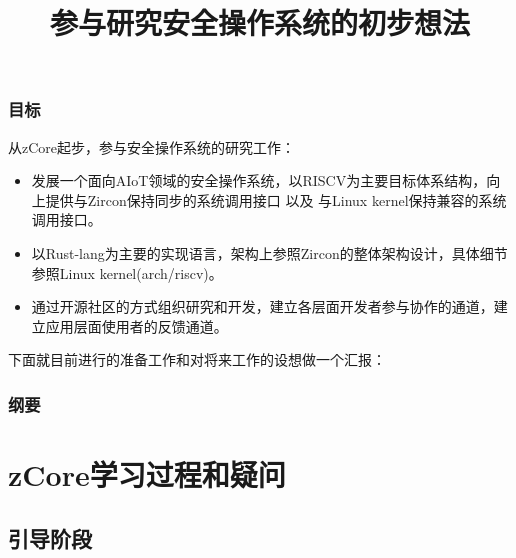 \documentclass[
8pt, %
]{beamer}
\title{参与研究安全操作系统的初步想法}
\institute[Massclouds]{\large 乾云科技}
\begin{document}
	\begin{frame}
		\titlepage
	\end{frame}

	\begin{frame}
		\frametitle{目标}
		{\large 从zCore起步，参与安全操作系统的研究工作：}
		\begin{itemize}
			\item {\large 发展一个面向AIoT领域的安全操作系统，以RISCV为主要目标体系结构，向上提供与Zircon保持同步的系统调用接口 以及 与Linux kernel保持兼容的系统调用接口。}
			\item {\large 以Rust-lang为主要的实现语言，架构上参照Zircon的整体架构设计，具体细节参照Linux kernel(arch/riscv)。}
			\item {\large 通过开源社区的方式组织研究和开发，建立各层面开发者参与协作的通道，建立应用层面使用者的反馈通道。}
		\end{itemize}
		{\large 下面就目前进行的准备工作和对将来工作的设想做一个汇报：}
	\end{frame}

	\begin{frame}
		\frametitle{纲要}
		\tableofcontents
	\end{frame}

	\section{zCore学习过程和疑问}
	
	\subsection{引导阶段}
	
\end{document}
